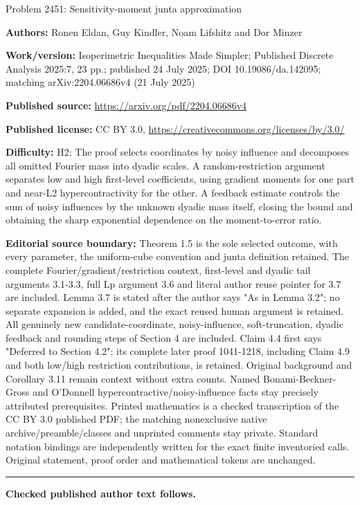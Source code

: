 \documentclass[10pt]{article}
\begin{document}
\begin{center}\Large Problem 2451: Sensitivity-moment junta approximation\end{center}\noindent\textbf{Authors:} Ronen Eldan, Guy Kindler, Noam Lifshitz and Dor Minzer\par\noindent\textbf{Work/version:} Isoperimetric Inequalities Made Simpler; Published Discrete Analysis 2025:7, 23 pp.; published 24 July 2025; DOI 10.19086/da.142095; matching arXiv:2204.06686v4 (21 July 2025)\par\noindent\textbf{Published source:} \url{https://arxiv.org/pdf/2204.06686v4}\par\noindent\textbf{Published license:} CC BY 3.0, \url{https://creativecommons.org/licenses/by/3.0/}\par\noindent\textbf{Difficulty:} H2: The proof selects coordinates by noisy influence and decomposes all omitted Fourier mass into dyadic scales. A random-restriction argument separates low and high first-level coefficients, using gradient moments for one part and near-L2 hypercontractivity for the other. A feedback estimate controls the sum of noisy influences by the unknown dyadic mass itself, closing the bound and obtaining the sharp exponential dependence on the moment-to-error ratio.\par\medskip\noindent\textbf{Editorial source boundary:} Theorem 1.5 is the sole selected outcome, with every parameter, the uniform-cube convention and junta definition retained. The complete Fourier/gradient/restriction context, first-level and dyadic tail arguments 3.1-3.3, full Lp argument 3.6 and literal author reuse pointer for 3.7 are included. Lemma 3.7 is stated after the author says "As in Lemma 3.2"; no separate expansion is added, and the exact reused human argument is retained. All genuinely new candidate-coordinate, noisy-influence, soft-truncation, dyadic feedback and rounding steps of Section 4 are included. Claim 4.4 first says "Deferred to Section 4.2"; its complete later proof 1041-1218, including Claim 4.9 and both low/high restriction contributions, is retained. Original background and Corollary 3.11 remain context without extra counts. Named Bonami-Beckner-Gross and O'Donnell hypercontractive/noisy-influence facts stay precisely attributed prerequisites. Printed mathematics is a checked transcription of the CC BY 3.0 published PDF; the matching nonexclusive native archive/preamble/classes and unprinted comments stay private. Standard notation bindings are independently written for the exact finite inventoried calls. Original statement, proof order and mathematical tokens are unchanged.\par\medskip\hrule\medskip\noindent\textbf{Checked published author text follows.}\par
\end{document}
